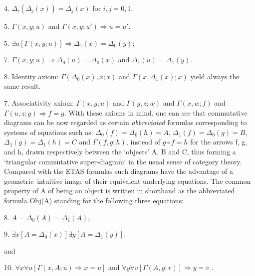 \documentclass[12pt]{article}
\theoremstyle{plain}
\theoremstyle{definition}
\numberwithin{equation}{section}
\begin{document}
4. $\Delta_i(\Delta_j(x))=\Delta_j(x)$ for  $i,j = 0, 1$. 

5. $\Gamma(x,y;u)$ and $\Gamma(x,y;u')\Rightarrow u = u'$.

5. $ \exists u [\Gamma(x,y;u)] \Rightarrow \Delta_1(x) =  \Delta_0(y)$;

7. $\Gamma(x,y;u) \Rightarrow \Delta_0(u) =  \Delta_0(x)$ and $\Delta_1(u) =  \Delta_1(y)$.

8. Identity axiom:
$ \Gamma(\Delta_0 (x), x;x)$ and  $ \Gamma(x, \Delta_1 (x);x)$  yield always the same result.

7. Associativity axiom: $\Gamma(x,y;u)$ and $\Gamma(y,z;w)$ and $\Gamma(x,w;f)$ and $\Gamma(u,z;g)\Rightarrow f = g $.
With these axioms in mind, one can see that commutative diagrams can be now regarded as certain 
\textit{abbreviated} formulas corresponding to systems of equations such as:  
$\Delta_0(f) = \Delta_0(h) = A$, $\Delta_1(f) = \Delta_0(g) = B$, $\Delta_1(g) = \Delta_1(h) = C$ 
and $\Gamma(f,g;h)$, instead of $g\circ f = h$ for the arrows f, g, and h, drawn respectively between the 
`objects' A, B and C, thus forming a `triangular commutative super-diagram` in the usual sense of category theory. Compared with the ETAS formulas such diagrams have the advantage of a geometric--intuitive image of their equivalent underlying equations. The common property of A of being an object is written in shorthand as the abbreviated formula Obj(A) standing for the following three equations:

8. $A = \Delta_0(A) = \Delta_1(A)$,

9. $ \exists x[A = \Delta_0 (x)] \exists y[A = \Delta_1 (y)]$,

and 

10. $\forall x \forall u [\Gamma (x,A; u)\Rightarrow x = u]$ and 
$ \forall y  \forall v [\Gamma (A,y; v)] \Rightarrow y = v$ .  
\end{document}
